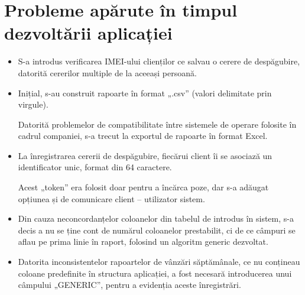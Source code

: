 \chapter{Probleme apărute în timpul dezvoltării aplicației}

	\begin{itemize}
		\item
		S-a introdus verificarea IMEI-ului clienților ce salvau o cerere de despăgubire, datorită cererilor multiple de la aceeași persoană.
		\item
		Inițial, s-au construit rapoarte în format „.csv” (valori delimitate prin virgule).

		Datorită problemelor de compatibilitate între sistemele de operare folosite în cadrul companiei, s-a trecut la exportul de rapoarte în format Excel.

		\item La înregistrarea cererii de despăgubire, fiecărui client îi se asociază un identificator unic, format din 64 caractere.

		Acest „token” era folosit doar pentru a încărca poze, dar s-a adăugat opțiunea și de comunicare client -- utilizator sistem.

		\item
		Din cauza neconcordanțelor coloanelor din tabelul de introdus în sistem, s-a decis a nu se ține cont de numărul coloanelor prestabilit, ci de ce câmpuri se aflau pe prima linie în raport, folosind un algoritm generic dezvoltat.

		\item
		Datorita inconsistentelor rapoartelor de vânzări săptămânale, ce nu conțineau coloane predefinite în structura aplicației, a fost necesară introducerea unui câmpului  „GENERIC”, pentru a evidenția aceste înregistrări.
	\end{itemize}
